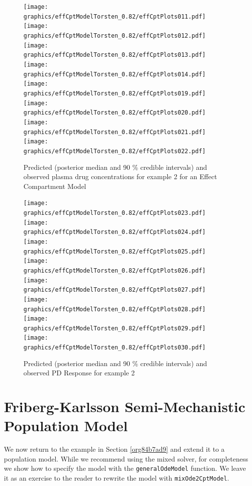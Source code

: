\documentclass[11pt, reqno, oneside]{amsbook}
\numberwithin{equation}{chapter}
\numberwithin{figure}{chapter}
\numberwithin{table}{chapter}
\theoremstyle{remark}
\begin{document}
\begin{figure}[!htb]
  \texttt{[image: graphics/effCptModelTorsten\_0.82/effCptPlots011.pdf]}
  \texttt{[image: graphics/effCptModelTorsten\_0.82/effCptPlots012.pdf]}
  \texttt{[image: graphics/effCptModelTorsten\_0.82/effCptPlots013.pdf]}
  \texttt{[image: graphics/effCptModelTorsten\_0.82/effCptPlots014.pdf]}
  \texttt{[image: graphics/effCptModelTorsten\_0.82/effCptPlots019.pdf]}
  \texttt{[image: graphics/effCptModelTorsten\_0.82/effCptPlots020.pdf]}
  \texttt{[image: graphics/effCptModelTorsten\_0.82/effCptPlots021.pdf]}
  \texttt{[image: graphics/effCptModelTorsten\_0.82/effCptPlots022.pdf]}
  \caption{{Predicted (posterior median and 90 \% credible intervals) and observed plasma drug concentrations for example 2 for an Effect Compartment Model}}
  \label{effCptModelPredictionsPK}
\end{figure}

\begin{figure}[!htb]
\texttt{[image: graphics/effCptModelTorsten\_0.82/effCptPlots023.pdf]}
\texttt{[image: graphics/effCptModelTorsten\_0.82/effCptPlots024.pdf]}
\texttt{[image: graphics/effCptModelTorsten\_0.82/effCptPlots025.pdf]}
\texttt{[image: graphics/effCptModelTorsten\_0.82/effCptPlots026.pdf]}
\texttt{[image: graphics/effCptModelTorsten\_0.82/effCptPlots027.pdf]}
\texttt{[image: graphics/effCptModelTorsten\_0.82/effCptPlots028.pdf]}
\texttt{[image: graphics/effCptModelTorsten\_0.82/effCptPlots029.pdf]}
\texttt{[image: graphics/effCptModelTorsten\_0.82/effCptPlots030.pdf]}
\caption{{Predicted (posterior median and 90 \% credible intervals) and observed PD Response for example 2}}
\label{effCptModelPredictionsPD}
\end{figure}

\section{Friberg-Karlsson Semi-Mechanistic Population Model}
\label{sec:org275475f}
We now return to the example in Section \ref{org84b7ad9} and extend
it to a population model. While we recommend using the mixed
solver, for completeness we show how to specify the model
with the \texttt{generalOdeModel} function. We leave it
as an exercise to the reader to rewrite the model with
\texttt{mixOde2CptModel}. 
\end{document}
